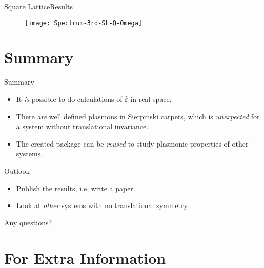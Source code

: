 \documentclass{beamer}
\begin{document}
\begin{frame}{Square Lattice}{Results}
    \begin{figure}
    \texttt{[image: Spectrum-3rd-SL-Q-Omega]}
    \end{figure}
\end{frame}



\section{Summary}

\begin{frame}{Summary}
  \begin{itemize}
  \item \Large{It \emph{is} possible to do calculations of $\hat\varepsilon$ in real space.}
  \item \Large{There \emph{are} well defined plasmons in Sierpinski carpets, which is \emph{unexpected} for a system without translational invariance.}
  \item \Large{The created package can be \emph{reused} to study plasmonic properties of other systems.}
  \end{itemize}
\end{frame}

\begin{frame}{Outlook}
    \begin{itemize}
    \item \Large{Publish the results, i.e. write a paper.}
    \item \Large{Look at \emph{other} systems with no translational symmetry.}
    \end{itemize}
\end{frame}

\begin{frame}{}
    \vfill
    \begin{minipage}{\textwidth}
    \begin{center}
        \Large Any questions?
    \end{center}
    \end{minipage}
    \vfill
\end{frame}


\appendix

\section{For Extra Information}
\end{document}
